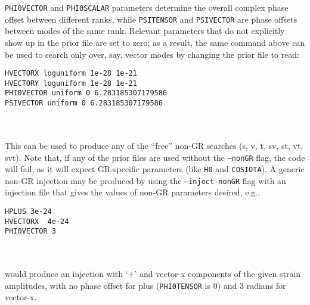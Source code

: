 {\tt PHI0VECTOR} and {\tt PHI0SCALAR} parameters determine the overall complex phase offset between different ranks, while {\tt PSITENSOR} and {\tt PSIVECTOR} are 
phase offsets between modes of the same rank. Relevant parameters that do not explicitly show up in the prior file are set to zero; as a result, the same command above
can be used to search only over, say, vector modes by changing the prior file to read:
\begin{lrbox}{\Lst}
\begin{lstlisting}
HVECTORX loguniform 1e-28 1e-21
HVECTORY loguniform 1e-28 1e-21
PHI0VECTOR uniform 0 6.283185307179586
PSIVECTOR uniform 0 6.283185307179586
\end{lstlisting}
\end{lrbox}
\\[5pt] \indent \fbox{\usebox{\Lst}} \\[5pt]
This can be used to produce any of the ``free'' non-GR searches (s, v, t, sv, st, vt, svt). Note that, if any of the prior files are used without the {\tt --nonGR}
flag, the code will fail, as it will expect GR-specific parameters (like {\tt H0} and {\tt COSIOTA}). A generic non-GR injection may be produced by using the
{\tt --inject-nonGR} flag with an injection file that gives the values of non-GR parameters desired, e.g.,
\begin{lrbox}{\Lst}
\begin{lstlisting}
HPLUS 3e-24
HVECTORX  4e-24
PHI0VECTOR 3
\end{lstlisting}
\end{lrbox}
\\[5pt] \indent \fbox{\usebox{\Lst}} \\[5pt]
would produce an injection with `+' and vector-x components of the given strain amplitudes, with no phase offset for plus ({\tt PHI0TENSOR} is 0) and 3 radians for
vector-x.

